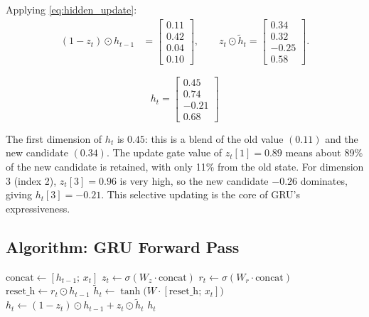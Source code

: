 \documentclass[12pt,a4paper]{article}
\begin{document}
Applying \cref{eq:hidden_update}:
\begin{align}
  (1 - z_t)\odot h_{t-1}
  &= \begin{bmatrix} 0.11 \\ 0.42 \\ 0.04 \\ 0.10 \end{bmatrix},
  \qquad
  z_t \odot \tilde{h}_t
  = \begin{bmatrix} 0.34 \\ 0.32 \\ -0.25 \\ 0.58 \end{bmatrix}.
\end{align}

\begin{equation}
  \boxed{h_t = \begin{bmatrix} 0.45 \\ 0.74 \\ -0.21 \\ 0.68 \end{bmatrix}}
\end{equation}

\begin{example}[title=Interpreting the Numerical Result]
The first dimension of $h_t$ is $0.45$: this is a blend of the old value $(0.11)$ and the new
candidate $(0.34)$. The update gate value of $z_t[1] = 0.89$ means about 89\% of the new candidate
is retained, with only 11\% from the old state. For dimension 3 (index 2), $z_t[3] = 0.96$ is very
high, so the new candidate $-0.26$ dominates, giving $h_t[3] = -0.21$. This selective updating is
the core of GRU's expressiveness.
\end{example}

\subsection{Algorithm: GRU Forward Pass}

\begin{algorithm}[H]
\caption{GRU Forward Pass (single time step)}
\label{alg:gru_forward}
\DontPrintSemicolon
{}
\BlankLine
$\text{concat} \leftarrow [h_{t-1};\, x_t]$
\BlankLine
{}
$z_t \leftarrow \sigma(W_z \cdot \text{concat})$\;
\BlankLine
{}
$r_t \leftarrow \sigma(W_r \cdot \text{concat})$\;
\BlankLine
{}
$\text{reset\_h} \leftarrow r_t \odot h_{t-1}$\;
$\tilde{h}_t \leftarrow \tanh\!\bigl(W \cdot [\text{reset\_h};\, x_t]\bigr)$\;
\BlankLine
{}
$h_t \leftarrow (1 - z_t)\odot h_{t-1} + z_t \odot \tilde{h}_t$\;
\BlankLine
\Return $h_t$\;
\end{algorithm}
\end{document}
